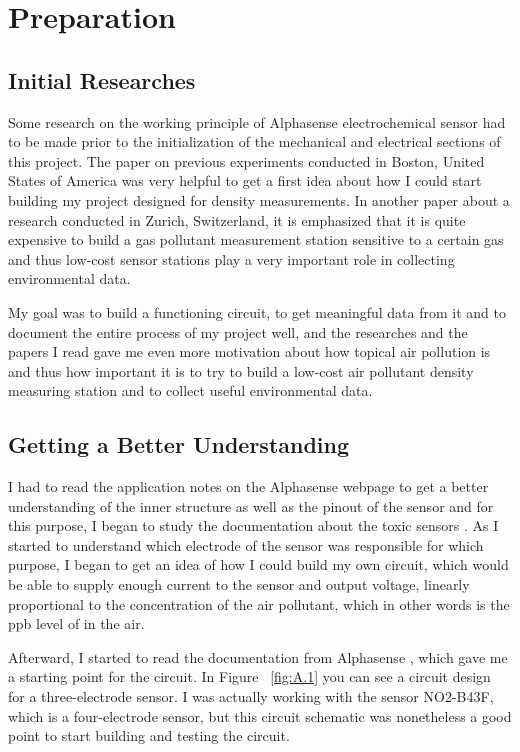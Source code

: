 \chapter{Preparation}
\label{sec:firststeps}

\section{Initial Researches}
Some research on the working principle of Alphasense  electrochemical sensor had to be made prior to the initialization of the mechanical and electrical sections of this project. The paper \cite{Hutton2011} on previous experiments conducted in Boston, United States of America was very helpful to get a first idea about how I could start building my project designed for  density measurements. In another paper about a research conducted in Zurich, Switzerland, \cite{Mueller2017} it is emphasized that it is quite expensive to build a gas pollutant measurement station sensitive to a certain gas and thus low-cost sensor stations play a very important role in collecting environmental data. \par 
My goal was to build a functioning circuit, to get meaningful data from it and to document the entire process of my project well, and the researches and the papers I read gave me even more motivation about how topical air pollution is and thus how important it is to try to build a low-cost air pollutant density measuring station and to collect useful environmental data.

\section{Getting a Better Understanding}
I had to read the application notes on the Alphasense webpage to get a better understanding of the inner structure as well as the pinout of the sensor and for this purpose, I began to study the documentation about the toxic sensors \cite{HowElectrochemicalGasSensorsWork}. As I started to understand which electrode of the sensor was responsible for which purpose, I began to get an idea of how I could build my own circuit, which would be able to supply enough current to the sensor and output voltage, linearly proportional to the concentration of the air pollutant, which in other words is the ppb level of  in the air. \par
Afterward, I started to read the documentation from Alphasense \cite{2009}, which gave me a starting point for the circuit. In Figure ~\ref{fig:A.1} you can see a circuit design for a three-electrode sensor. I was actually working with the sensor NO2-B43F, which is a four-electrode sensor, but this circuit schematic was nonetheless a good point to start building and testing the circuit.

